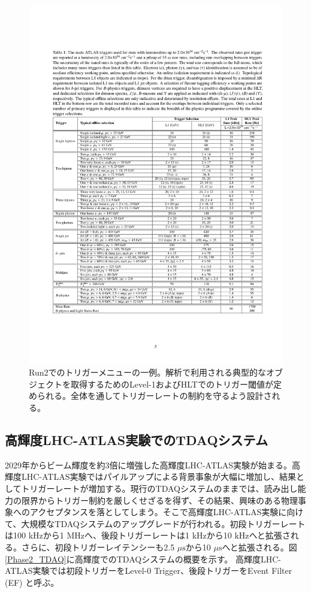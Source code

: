     \begin{figure} 
    \centering
    \includegraphics[width=16cm]{fig/Intro/Run2_Triggermenu.pdf}
    \caption[Run2でのトリガーメニューの一例]{Run2でのトリガーメニューの一例\cite{Run2_Triggermenu}。解析で利用される典型的なオブジェクトを取得するためのLevel-1およびHLTでのトリガー閾値が定められる。全体を通してトリガーレートの制約を守るよう設計される。}
    \label{Run2_Triggermenu}
    \end{figure}

    \subsection{高輝度LHC-ATLAS実験でのTDAQシステム}
2029年からビーム輝度を約3倍に増強した高輝度LHC-ATLAS実験が始まる。高輝度LHC-ATLAS実験ではパイルアップによる背景事象が大幅に増加し、結果としてトリガーレートが増加する。現行のTDAQシステムのままでは、読み出し能力の限界からトリガー制約を厳しくせざるを得ず、その結果、興味のある物理事象へのアクセプタンスを落としてしまう。そこで高輝度LHC-ATLAS実験に向けて、大規模なTDAQシステムのアップグレードが行われる。初段トリガーレートは100 kHzから1 MHzへ、後段トリガーレートは1 kHzから10 kHzへと拡張される。さらに、初段トリガーレイテンシーも2.5 $\mu\mathrm{s}$から10 $\mu\mathrm{s}$へと拡張される。図\ref{Phase2_TDAQ}に高輝度でのTDAQシステムの概要を示す。
高輝度LHC-ATLAS実験では初段トリガーをLevel-0 Trigger、後段トリガーをEvent Filter (EF) と呼ぶ。

